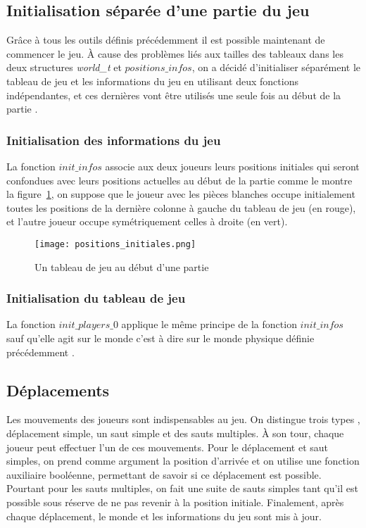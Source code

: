 \documentclass[11pt]{article}
\begin{document}
        \subsection{Initialisation séparée d'une partie du jeu}
            Grâce à tous les outils définis précédemment il est possible maintenant de commencer le jeu. À cause des problèmes liés aux tailles des tableaux dans les deux structures \textit{world\_t} et $positions\_infos$, on a décidé d'initialiser séparément le tableau de jeu et les informations du jeu en utilisant deux fonctions indépendantes, et ces dernières vont être utilisés une seule fois au début de la partie .
            \subsubsection{Initialisation des informations du jeu } %
                La fonction $init\_infos$ associe aux deux joueurs leurs positions initiales qui seront confondues avec leurs positions actuelles au début de la partie comme le montre la figure~\ref{figure13}, on suppose que le joueur avec les pièces blanches occupe initialement toutes les positions de la dernière colonne à gauche du tableau de jeu (en rouge), et l'autre joueur occupe symétriquement celles à droite (en vert).
                \begin{figure}[h]
                        \centering
                        \texttt{[image: positions\_initiales.png]}
                        \caption{ Un tableau de jeu au début d'une partie }
                        \label{figure13}
                        \end{figure}
                        \newpage
            \subsubsection{Initialisation du tableau de jeu }%
            La fonction $init\_players\_0$ applique le même principe de la fonction $init\_infos$ sauf qu'elle agit sur le monde c'est à dire sur le monde physique définie précédemment .
        \subsection{Déplacements}
            Les mouvements des joueurs sont indispensables au jeu. On distingue trois types , déplacement simple, un saut simple et des sauts multiples. À son tour, chaque joueur peut effectuer l'un de ces mouvements. Pour le déplacement et saut simples, on prend comme argument la position d'arrivée et on utilise une fonction auxiliaire booléenne, permettant de savoir si ce déplacement est possible. Pourtant pour les sauts multiples, on fait une suite de sauts simples tant qu'il est possible sous réserve de ne pas revenir à la position initiale. Finalement, après chaque déplacement, le monde et les informations du jeu sont mis à jour.
\end{document}
